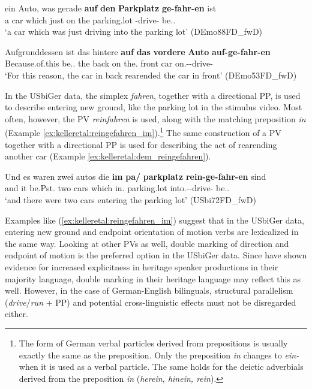 \documentclass[output=paper,colorlinks,citecolor=brown]{langscibook}
\begin{document}
\ea
\label{ex:kelleretal:auf_gefahren}
\gll ein Auto, was gerade \textbf{auf} \textbf{den} \textbf{Parkplatz} \textbf{ge-fahr-en} ist\\
a car which just on the parking.lot \Ptcp{}-drive-\Ptcp{} be.\Prs.\Tsg\\
\glt `a car which was just driving into the parking lot' (DEmo88FD\_fwD)

\ex
\label{ex:kelleretal:auf_aufgefahren}
\gll Aufgrunddessen ist das hintere \textbf{auf} \textbf{das} \textbf{vordere} \textbf{Auto} \textbf{auf-ge-fahr-en}\\
Because.of.this be.\Prs.\Tsg{} the back on the.\Acc{} front car on.\Vpart{}-\Ptcp{}-drive-\Ptcp{}\\
\glt `For this reason, the car in back rearended the car in front' (DEmo53FD\_fwD)
\z

In the USbiGer data, the simplex \textit{fahren}, together with a directional PP, is used to describe entering new ground, like the parking lot in the stimulus video. Most often, however, the PV \textit{reinfahren} is used, along with the matching preposition \textit{in} (Example \ref{ex:kelleretal:reingefahren_im}).\footnote{The form of German verbal particles derived from prepositions is usually exactly the same as the preposition. Only the preposition \textit{in} changes to \textit{ein-} when it is used as a verbal particle. The same holds for the deictic adverbials derived from the preposition \textit{in} (\textit{herein, hinein, rein}).} The same construction of a PV together with a directional PP is used for describing the act of rearending another car (Example \ref{ex:kelleretal:dem_reingefahren}). 

\ea
\label{ex:kelleretal:reingefahren_im}
\gll Und es waren zwei autos die \textbf{im} \textbf{pa/} \textbf{parkplatz} \textbf{rein-ge-fahr-en} sind\\
and it be.Pst.\Tpl{} two cars which in.\Dat{} {} parking.lot into.\Vpart{}-\Ptcp{}-drive-\Ptcp{} be.\Prs.\Tpl{} \\
\glt `and there were two cars entering the parking lot' (USbi72FD\_fwD)
\z

Examples like (\ref{ex:kelleretal:reingefahren_im}) suggest that in the USbiGer data, entering new ground and endpoint orientation of motion verbs are lexicalized in the same way. Looking at other PVs as well, double marking of direction and endpoint of motion is the preferred option in the USbiGer data. Since \citet{PashkovaHodgeShanley2020Explicitness} have shown evidence for increased explicitness in heritage speaker productions in their majority language, double marking in their heritage language may reflect this as well. However, in the case of German-English bilinguals, structural parallelism (\textit{drive}/\textit{run} + PP) and potential cross-linguistic effects must not be disregarded either.
\end{document}
